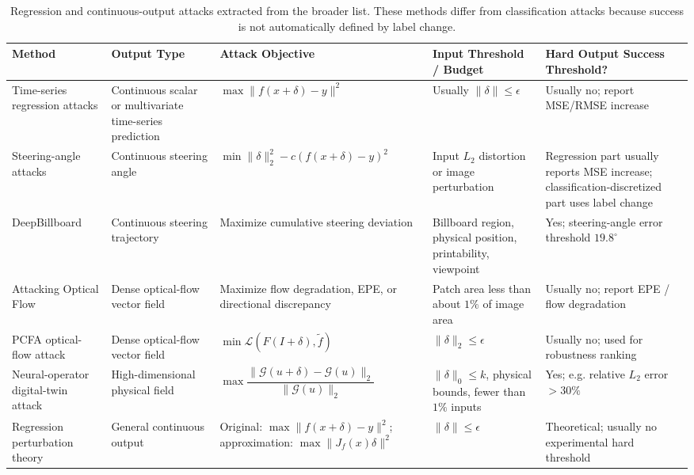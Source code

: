 \documentclass{article}
\begin{document}
\begin{table}[h]
\centering
\small
\begin{tabular}{p{3.3cm} p{2.8cm} p{3.4cm} p{3.4cm} p{2.5cm}}
\hline
\textbf{Method} & \textbf{Output Type} & \textbf{Attack Objective} & \textbf{Input Threshold / Budget} & \textbf{Hard Output Success Threshold?} \\
\hline
Time-series regression attacks
&
Continuous scalar or multivariate time-series prediction
&
\(\max \|f(x+\delta)-y\|^2\)
&
Usually \(\|\delta\|\leq \epsilon\)
&
Usually no; report MSE/RMSE increase
\\

Steering-angle attacks
&
Continuous steering angle
&
\(\min \|\delta\|_2^2-c(f(x+\delta)-y)^2\)
&
Input \(L_2\) distortion or image perturbation
&
Regression part usually reports MSE increase; classification-discretized part uses label change
\\

DeepBillboard
&
Continuous steering trajectory
&
Maximize cumulative steering deviation
&
Billboard region, physical position, printability, viewpoint
&
Yes; steering-angle error threshold \(19.8^\circ\)
\\

Attacking Optical Flow
&
Dense optical-flow vector field
&
Maximize flow degradation, EPE, or directional discrepancy
&
Patch area less than about \(1\%\) of image area
&
Usually no; report EPE / flow degradation
\\

PCFA optical-flow attack
&
Dense optical-flow vector field
&
\(\min \mathcal{L}(F(I+\delta),\tilde f)\)
&
\(\|\delta\|_2\leq \epsilon\)
&
Usually no; used for robustness ranking
\\

Neural-operator digital-twin attack
&
High-dimensional physical field
&
\(\max \dfrac{\|\mathcal{G}(u+\delta)-\mathcal{G}(u)\|_2}{\|\mathcal{G}(u)\|_2}\)
&
\(\|\delta\|_0\leq k\), physical bounds, fewer than \(1\%\) inputs
&
Yes; e.g. relative \(L_2\) error \(>30\%\)
\\

Regression perturbation theory
&
General continuous output
&
Original: \(\max \|f(x+\delta)-y\|^2\); approximation: \(\max \|J_f(x)\delta\|^2\)
&
\(\|\delta\|\leq \epsilon\)
&
Theoretical; usually no experimental hard threshold
\\
\hline
\end{tabular}
\caption{Regression and continuous-output attacks extracted from the broader list. These methods differ from classification attacks because success is not automatically defined by label change.}
\end{table}
\end{document}
